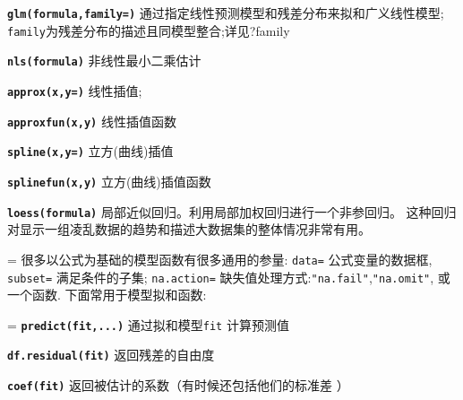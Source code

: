 \documentclass[landscape]{article}
\newcommand{\code}{\texttt}
\newcommand{\bcode}[1]{\texttt{\textbf{#1}}}
\begin{document}
\begin{multicols*}{3}
\bcode{glm(formula,family=)} 通过指定线性预测模型和残差分布来拟和广义线性模型;
\code{family}为残差分布的描述且同模型整合;详见{?family}



\bcode{nls(formula)} 非线性最小二乘估计

\bcode{approx(x,y=)} 线性插值;

\bcode{approxfun(x,y)}  线性插值函数

\bcode{spline(x,y=)} 立方(曲线)插值

\bcode{splinefun(x,y)} 立方(曲线)插值函数

\bcode{loess(formula)} 局部近似回归。利用局部加权回归进行一个非参回归。
这种回归对显示一组凌乱数据的趋势和描述大数据集的整体情况非常有用。

\everypar={\hangindent=0mm}
很多以公式为基础的模型函数有很多通用的参量: \code{data=} 公式变量的数据框, \code{subset=} 满足条件的子集;
\code{na.action=} 缺失值处理方式:\code{"na.fail"},\code{"na.omit"}, 或一个函数.
下面常用于模型拟和函数:

\everypar={\hangindent=9mm}
\bcode{predict(fit,...)}  通过拟和模型\code{fit} 计算预测值

\bcode{df.residual(fit)}  返回残差的自由度

\bcode{coef(fit)}  返回被估计的系数（有时候还包括他们的标准差 ）


\end{multicols*}
\end{document}

